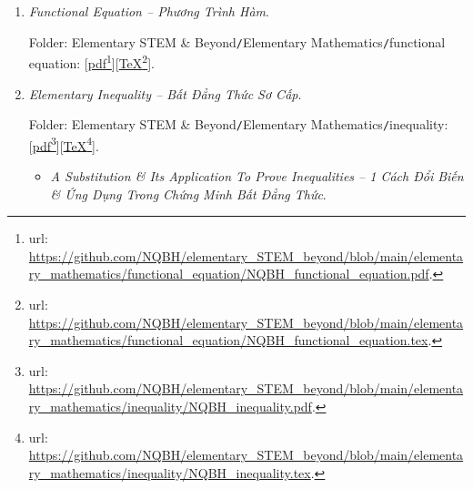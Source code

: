 \documentclass[12pt]{article}
\begin{document}
\begin{enumerate}
\begin{itemize}
		Folder: {\sf Elementary STEM \& Beyond{\tt/}Elementary Mathematics{\tt/}equation \& inequation{\tt/}solution}: [\href{https://github.com/NQBH/elementary_STEM_beyond/blob/main/elementary_mathematics/equation_inequation/solution/NQBH_equation_inequation_solution.pdf}{pdf}\footnote{{\sc url}: \url{https://github.com/NQBH/elementary_STEM_beyond/blob/main/elementary_mathematics/equation_inequation/solution/NQBH_equation_inequation_solution.pdf}.}][\href{https://github.com/NQBH/elementary_STEM_beyond/blob/main/elementary_mathematics/equation_inequation/solution/NQBH_equation_inequation_solution.tex}{\TeX}\footnote{{\sc url}: \url{https://github.com/NQBH/elementary_STEM_beyond/blob/main/elementary_mathematics/equation_inequation/solution/NQBH_equation_inequation_solution.tex}.}].
	\end{itemize}
	\item {\it Functional Equation -- Phương Trình Hàm}.
	
	Folder: {\sf Elementary STEM \& Beyond{\tt/}Elementary Mathematics{\tt/}functional equation}: [\href{https://github.com/NQBH/elementary_STEM_beyond/blob/main/elementary_mathematics/functional_equation/NQBH_functional_equation.pdf}{pdf}\footnote{{\sc url}: \url{https://github.com/NQBH/elementary_STEM_beyond/blob/main/elementary_mathematics/functional_equation/NQBH_functional_equation.pdf}.}][\href{https://github.com/NQBH/elementary_STEM_beyond/blob/main/elementary_mathematics/functional_equation/NQBH_functional_equation.tex}{\TeX}\footnote{{\sc url}: \url{https://github.com/NQBH/elementary_STEM_beyond/blob/main/elementary_mathematics/functional_equation/NQBH_functional_equation.tex}.}].
	\item {\it Elementary Inequality -- Bất Đẳng Thức Sơ Cấp}.
	
	Folder: {\sf Elementary STEM \& Beyond{\tt/}Elementary Mathematics{\tt/}inequality}: [\href{https://github.com/NQBH/elementary_STEM_beyond/blob/main/elementary_mathematics/inequality/NQBH_inequality.pdf}{pdf}\footnote{{\sc url}: \url{https://github.com/NQBH/elementary_STEM_beyond/blob/main/elementary_mathematics/inequality/NQBH_inequality.pdf}.}][\href{https://github.com/NQBH/elementary_STEM_beyond/blob/main/elementary_mathematics/inequality/NQBH_inequality.tex}{\TeX}\footnote{{\sc url}: \url{https://github.com/NQBH/elementary_STEM_beyond/blob/main/elementary_mathematics/inequality/NQBH_inequality.tex}.}].
	\begin{itemize}
		\item {\it A Substitution \& Its Application To Prove Inequalities -- 1 Cách Đổi Biến \& Ứng Dụng Trong Chứng Minh Bất Đẳng Thức}.
		

\end{itemize}
\end{enumerate}
\end{document}

